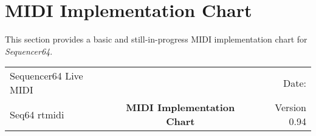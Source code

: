 %
%
%

\section{MIDI Implementation Chart}
\label{sec:midi_impl_chart}

   This section provides a basic and still-in-progress MIDI implementation
   chart for \textsl{Sequencer64}.

   \begin{table}[htb]
      \label{table:midi_impl_chart_top}
      \begin{tabular}{l c r}
         Sequencer64 Live MIDI &   & Date: \date{\today} \\
         Seq64 rtmidi & \textbf{MIDI Implementation Chart} & Version 0.94 \\
      \end{tabular}
   \end{table}

